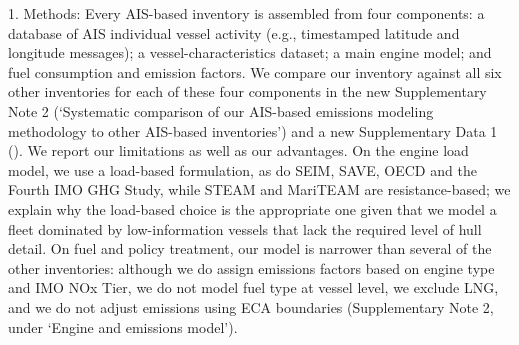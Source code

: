 \documentclass[11pt]{article}
\begin{document}
1. Methods: Every AIS-based inventory is assembled from four components: a database of AIS individual vessel activity (e.g., timestamped latitude and longitude messages); a vessel-characteristics dataset; a main engine model; and fuel consumption and emission factors. We compare our inventory against all six other inventories for each of these four components in the new Supplementary Note 2 (`Systematic comparison of our AIS-based emissions modeling methodology to other AIS-based inventories') and a new Supplementary Data 1 (). We report our limitations as well as our advantages. On the engine load model, we use a load-based formulation, as do SEIM, SAVE, OECD and the Fourth IMO GHG Study, while STEAM and MariTEAM are resistance-based; we explain why the load-based choice is the appropriate one given that we model a fleet dominated by low-information vessels that lack the required level of hull detail. On fuel and policy treatment, our model is narrower than several of the other inventories: although we do assign emissions factors based on engine type and IMO NOx Tier, we do not model fuel type at vessel level, we exclude LNG, and we do not adjust emissions using ECA boundaries (Supplementary Note 2, under `Engine and emissions model').
\end{document}
